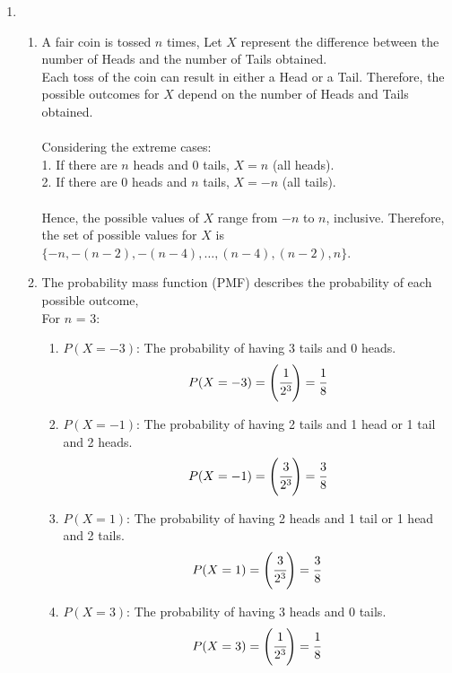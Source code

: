 \documentclass{article}
\begin{document}
\begin{enumerate}
\newpage
\item 
  \begin{enumerate}
    \item 
      A fair coin is tossed $n$ times, Let $X$ represent the difference between the number of Heads and the number of Tails obtained.\\
      Each toss of the coin can result in either a Head or a Tail. Therefore, the possible outcomes for $X$ depend on the number of Heads and Tails obtained.\\\\
      Considering the extreme cases:\\
      1. If there are \( n \) heads and 0 tails, \( X = n \) (all heads).\\
      2. If there are 0 heads and \( n \) tails, \( X = -n \) (all tails).\\\\
      Hence, the possible values of \( X \) range from \( -n \) to \( n \), inclusive. Therefore, the set of possible values for \( X \) is \( \{-n, -(n-2), -(n-4), \ldots, (n-4), (n-2), n\} \).\\
    \item 
    The probability mass function (PMF) describes the probability of each possible outcome,\\ For $n$ = 3:
    \begin{enumerate}
      \item \(P(X = -3)\): The probability of having 3 tails and 0 heads.
      \[ P(X = -3) = \left(\cfrac{1}{2^3}\right) = \cfrac{1}{8} \]
      \item \(P(X = -1)\): The probability of having 2 tails and 1 head or 1 tail and 2 heads.
      \[ P(X = -1) = \left(\cfrac{3}{2^3}\right) = \cfrac{3}{8} \]
      \item \(P(X = 1)\): The probability of having 2 heads and 1 tail or 1 head and 2 tails.
      \[ P(X = 1) = \left(\cfrac{3}{2^3}\right) = \cfrac{3}{8} \]
      \item \(P(X = 3)\): The probability of having 3 heads and 0 tails.
      \[ P(X = 3) = \left(\cfrac{1}{2^3}\right) = \cfrac{1}{8} \]
    \end{enumerate}
  \end{enumerate}
\end{enumerate}
\end{document}
